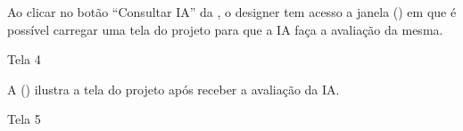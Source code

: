 Ao clicar no botão “Consultar IA” da , o designer tem acesso a janela () em que é possível carregar uma tela do projeto para que a IA faça a avaliação da mesma. 

\begin{photograph}[H]
    \centering
    \caption{Tela 4}%
    \label{phot:pg-tela4}
    \end{photograph}

A () ilustra a tela do projeto após receber a avaliação da IA. 

\begin{photograph}[H]
    \centering
    \caption{Tela 5}%
    \label{phot:pg-tela5}
    \end{photograph}

